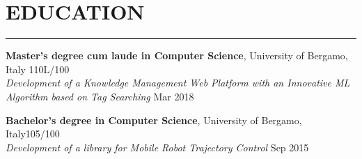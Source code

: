 \documentclass[10pt]{article}
\newcommand{\cvsection}[1]{\section*{\centering\normalsize\uppercase{#1}}\vspace{-16pt}\rule{\linewidth}{0.2pt}\vspace{6pt}}
\begin{document}
\cvsection{education}
\textbf{Master's degree cum laude in Computer Science}, University of Bergamo, Italy \hfill 110L\slash100 \\
\textit{Development of a Knowledge Management Web Platform with an Innovative ML Algorithm based on Tag Searching} \hfill Mar 2018

\vspace{6pt} %

\textbf{Bachelor's degree in Computer Science}, University of Bergamo, Italy\hfill 105\slash100 \\
\textit{Development of a library for Mobile Robot Trajectory Control} \hfill Sep 2015

\end{document}
